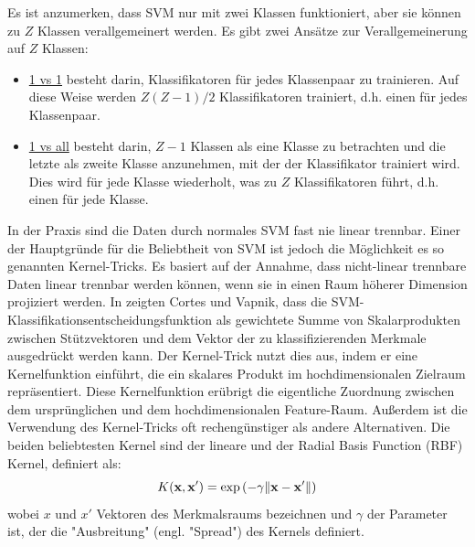 Es ist anzumerken, dass SVM nur mit zwei Klassen funktioniert, aber sie können zu $ Z $ Klassen verallgemeinert werden.
Es gibt zwei Ansätze zur Verallgemeinerung auf $ Z $ Klassen:
\begin{itemize} %
  \item \underline{1 vs 1} besteht darin, Klassifikatoren für jedes Klassenpaar zu trainieren. Auf diese Weise werden $ Z(Z-1)/ 2$ Klassifikatoren trainiert, d.h. einen für jedes Klassenpaar.
  \item \underline{1 vs all} besteht darin, $ Z-1 $ Klassen als eine Klasse zu betrachten und die letzte als zweite Klasse anzunehmen, mit der der Klassifikator trainiert wird. Dies wird für jede Klasse wiederholt, was zu $ Z $ Klassifikatoren führt, d.h. einen für jede Klasse. \\
\end{itemize}

In der Praxis sind die Daten durch normales SVM fast nie linear trennbar.
Einer der Hauptgründe für die Beliebtheit von SVM ist jedoch die Möglichkeit es so genannten Kernel-Tricks.
Es basiert auf der Annahme, dass nicht-linear trennbare Daten linear trennbar werden können, wenn sie in einen Raum höherer Dimension projiziert werden.
In \cite{svn1995} zeigten Cortes und Vapnik, dass die SVM-Klassifikationsentscheidungsfunktion als gewichtete Summe von Skalarprodukten zwischen Stützvektoren und dem Vektor der zu klassifizierenden Merkmale ausgedrückt werden kann. 
Der Kernel-Trick nutzt dies aus, indem er eine Kernelfunktion einführt, die ein skalares Produkt im hochdimensionalen Zielraum repräsentiert. 
Diese Kernelfunktion erübrigt die eigentliche Zuordnung zwischen dem ursprünglichen und dem hochdimensionalen Feature-Raum.
Außerdem ist die Verwendung des Kernel-Tricks oft rechengünstiger als andere Alternativen.
Die beiden beliebtesten Kernel sind der lineare und der Radial Basis Function (RBF) Kernel, definiert als: 
\begin{equation} 
\Large{ {\displaystyle K(\mathbf {x} ,\mathbf {x'} )=\exp \left(-\gamma{\|\mathbf {x} -\mathbf {x'}}\right\|)} }
\end{equation}
wobei $ x $ und $ x' $ Vektoren des Merkmalsraums bezeichnen und $ \gamma $ der Parameter ist, der die "Ausbreitung" (engl. "Spread") des Kernels definiert. \\


